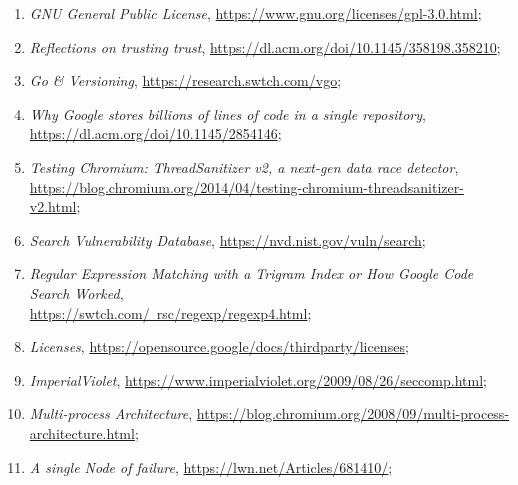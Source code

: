 \documentclass[a4paper,11pt]{article}
\begin{document}
\begin{enumerate}
\item \textit{GNU General Public License},
  \href{https://www.gnu.org/licenses/gpl-3.0.html}{https://www.gnu.org/licenses/gpl-3.0.html};

\item \textit{Reflections on trusting trust},
  \href{https://dl.acm.org/doi/10.1145/358198.358210}{https://dl.acm.org/doi/10.1145/358198.358210};

\item \textit{Go \& Versioning},
  \href{https://research.swtch.com/vgo}{https://research.swtch.com/vgo};

\item \textit{Why Google stores billions of lines of code in a single
    repository},
  \href{https://dl.acm.org/doi/10.1145/2854146}{https://dl.acm.org/doi/10.1145/2854146};

\item \textit{Testing Chromium: ThreadSanitizer v2, a next-gen data
    race
    detector}, \\
  \href{https://blog.chromium.org/2014/04/testing-chromium-threadsanitizer-v2.html}{https://blog.chromium.org/2014/04/testing-chromium-threadsanitizer-v2.html};

\item \textit{Search Vulnerability Database},
  \href{https://nvd.nist.gov/vuln/search}{https://nvd.nist.gov/vuln/search};

\item \textit{Regular Expression Matching with a Trigram Index or How
    Google Code Search Worked}, \\
  \href{https://swtch.com/~rsc/regexp/regexp4.html}{https://swtch.com/~rsc/regexp/regexp4.html};

\item \textit{Licenses},
  \href{https://opensource.google/docs/thirdparty/licenses}{https://opensource.google/docs/thirdparty/licenses};

\item \textit{ImperialViolet},
  \href{https://www.imperialviolet.org/2009/08/26/seccomp.html}{https://www.imperialviolet.org/2009/08/26/seccomp.html};

\item \textit{Multi-process Architecture},
  \href{https://blog.chromium.org/2008/09/multi-process-architecture.html}{https://blog.chromium.org/2008/09/multi-process-architecture.html};

\item \textit{A single Node of failure},
  \href{https://lwn.net/Articles/681410/}{https://lwn.net/Articles/681410/};


\end{enumerate}
\end{document}
